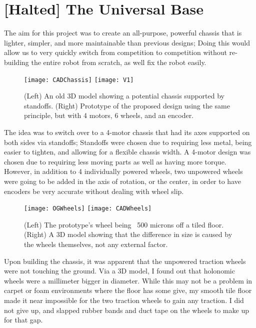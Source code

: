 \section{[Halted] The Universal Base}

The aim for this project was to create an all-purpose, powerful chassis that is lighter, simpler, and more maintainable than previous designs; Doing this would allow us to very quickly switch from competition to competition without re-building the entire robot from scratch, as well fix the robot easily.

\begin{figure}[h]
    \centering
    \texttt{[image: CADChassis]}
    \texttt{[image: V1]}
    \caption{
        (Left) An old 3D model showing a potential chassis supported by standoffs. (Right) Prototype of the proposed design using the same principle, but with 4 motors, 6 wheels, and an encoder.
    }
\end{figure}

The idea was to switch over to a 4-motor chassis that had its axes supported on both sides via standoffs; Standoffs were chosen due to requiring less metal, being easier to tighten, and allowing for a flexible chassis width. A 4-motor design was chosen due to requiring less moving parts as well as having more torque. However, in addition to 4 individually powered wheels, two unpowered wheels were going to be added in the axis of rotation, or the center, in order to have encoders be very accurate without dealing with wheel slip.

\begin{figure}[h]
    \centering
    \texttt{[image: OGWheels]}
    \texttt{[image: CADWheels]}
    \caption{
        (Left) The prototype's wheel being ~500 microns off a tiled floor. (Right) A 3D model showing that the difference in size is caused by the wheels themselves, not any external factor.
    }
\end{figure}

Upon building the chassis, it was apparent that the unpowered traction wheels were not touching the ground. Via a 3D model, I found out that holonomic wheels were a millimeter bigger in diameter. While this may not be a problem in carpet or foam environments where the floor has some give, my smooth tile floor made it near impossible for the two traction wheels to gain any traction. I did not give up, and slapped rubber bands and duct tape on the wheels to make up for that gap.

